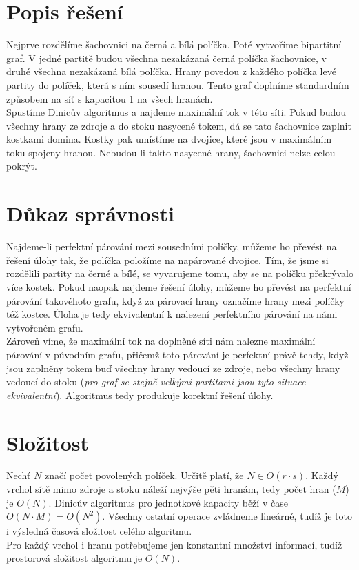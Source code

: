 \documentclass{scrartcl}
\begin{document}
\section{Popis řešení}

Nejprve rozdělíme šachovnici na černá a bílá políčka. Poté vytvoříme bipartitní graf. V jedné partitě budou všechna nezakázaná černá políčka šachovnice, v druhé všechna nezakázaná bílá políčka. Hrany povedou z každého políčka levé partity do políček, která s ním sousedí hranou. Tento graf doplníme standardním způsobem na síť s kapacitou 1 na všech hranách. \\

Spustíme Dinicův algoritmus a najdeme maximální tok v této síti. Pokud budou všechny hrany ze zdroje a do stoku nasycené tokem, dá se tato šachovnice zaplnit kostkami domina. Kostky pak umístíme na dvojice, které jsou v maximálním toku spojeny hranou. Nebudou-li takto nasycené hrany, šachovnici nelze celou pokrýt.

\section{Důkaz správnosti}

Najdeme-li perfektní párování mezi sousedními políčky, můžeme ho převést na řešení úlohy tak, že políčka položíme na napárované dvojice. Tím, že jsme si rozdělili partity na černé a bílé, se vyvarujeme tomu, aby se na políčku překrývalo více kostek. Pokud naopak najdeme řešení úlohy, můžeme ho převést na perfektní párování takovéhoto grafu, když za párovací hrany označíme hrany mezi políčky též kostce. Úloha je tedy ekvivalentní k nalezení perfektního párování na námi vytvořeném grafu. \\

Zároveň víme, že maximální tok na doplněné síti nám nalezne maximální párování v původním grafu, přičemž toto párování je perfektní právě tehdy, když jsou zaplněny tokem buď všechny hrany vedoucí ze zdroje, nebo všechny hrany vedoucí do stoku (\textit{pro graf se stejně velkými partitami jsou tyto situace ekvivalentní}). Algoritmus tedy produkuje korektní řešení úlohy.

\section{Složitost}
Nechť $N$ značí počet povolených políček. Určitě platí, že $N \in O(r \cdot s)$. Každý vrchol sítě mimo zdroje a stoku náleží nejvýše pěti hranám, tedy počet hran ($M$) je $O(N)$. Dinicův algoritmus pro jednotkové kapacity běží v čase $O(N \cdot M) = O(N^2)$. Všechny ostatní operace zvládneme lineárně, tudíž je toto i výsledná časová složitost celého algoritmu. \\

Pro každý vrchol i hranu potřebujeme jen konstantní množství informací, tudíž prostorová složitost algoritmu je $O(N)$.
\end{document}
